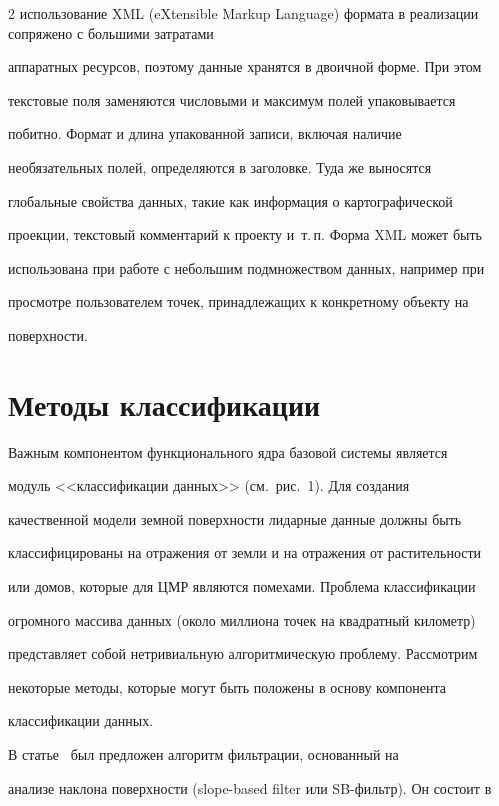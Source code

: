 \begin{multicols}{2}
использование XML (eXtensible Markup Language) формата в реализации сопряжено с большими затратами 

аппаратных ресурсов, поэтому данные хранятся в двоичной форме. При этом 

текстовые поля заменяются чис\-ло\-вы\-ми и максимум полей упаковывается 

побитно. Формат и длина упакованной записи, включая наличие 

необязательных полей, определяются в заголовке. Туда же выносятся 

глобальные свойства данных, такие как информация о картографической 

проекции, текс\-то\-вый комментарий к проекту и~т.\,п. Форма XML может быть 

использована при работе с небольшим подмножеством данных, например при 

просмотре пользователем точек, принадлежащих к конкретному объекту на 

поверхности.



\section{Методы классификации}

     

   Важным компонентом функционального ядра базовой системы является 

модуль <<классификации данных>> (см.\ рис.~1). Для создания 

качественной модели земной поверхности лидарные данные должны быть 

классифицированы на отражения от земли и на отражения от растительности 

или домов, которые для ЦМР являются помехами. Проб\-ле\-ма классификации 

огромного массива данных (около миллиона точек на квадратный километр) 

пред\-ставляет собой нетривиальную алгоритмическую проб\-ле\-му. Рассмотрим 

некоторые методы, которые могут быть положены в основу компонента 

классификации данных.



   В статье~\cite{9su} был предложен алгоритм фильтрации, основанный на 

анализе наклона поверхности (slope-based filter или SB-фильтр). Он состоит в 


\end{multicols}
